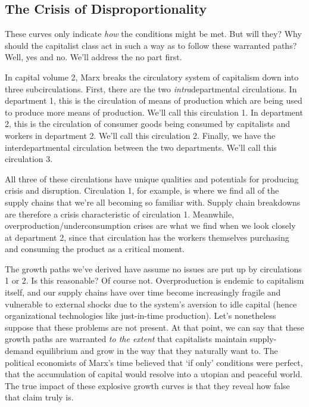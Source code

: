 \documentclass{article}
\theoremstyle{theorem}
\begin{document}
\subsection{The Crisis of Disproportionality}
These curves only indicate \emph{how} the conditions might be met. But will they? Why should the capitalist class act in such a way as to follow these warranted paths? Well, yes and no. We'll address the no part first. \par 
In capital volume 2, Marx breaks the circulatory system of capitalism down into three subcirculations. First, there are the two \emph{intra}departmental circulations. In department 1, this is the circulation of means of production which are being used to produce more means of production. We'll call this circulation 1. In department 2, this is the circulation of consumer goods being consumed by capitalists and workers in department 2. We'll call this circulation 2. Finally, we have the interdepartmental circulation between the two departments. We'll call this circulation 3. \par 
All three of these circulations have unique qualities and potentials for producing crisis and disruption. Circulation 1, for example, is where we find all of the supply chains that we're all becoming so familiar with. Supply chain breakdowns are therefore a crisis characteristic of circulation 1. Meanwhile, overproduction/underconsumption crises are what we find when we look closely at department 2, since that circulation has the workers themselves purchasing and consuming the product as a critical moment. \par 
The growth paths we've derived have assume no issues are put up by circulations 1 or 2. Is this reasonable? Of course not. Overproduction is endemic to capitalism itself, and our supply chains have over time become increasingly fragile and vulnerable to external shocks due to the system's aversion to idle capital (hence organizational technologies like just-in-time production). Let's nonetheless suppose that these problems are not present. At that point, we can say that these growth paths are warranted \emph{to the extent} that capitalists maintain supply-demand equilibrium and grow in the way that they naturally want to. The political economists of Marx's time believed that `if only' conditions were perfect, that the accumulation of capital would resolve into a utopian and peaceful world. The true impact of these explosive growth curves is that they reveal how false that claim truly is. \par 
\end{document}
